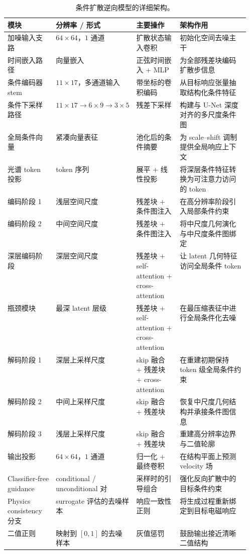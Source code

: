 \documentclass[10pt,a4paper]{article}
\begin{document}
\begin{table}[!htbp]
\centering
\caption{条件扩散逆向模型的详细架构。}
\begin{tabularx}{\linewidth}{>{\raggedright\arraybackslash}p{0.20\linewidth}>{\raggedright\arraybackslash}p{0.18\linewidth}>{\raggedright\arraybackslash}p{0.18\linewidth}X}
\toprule
模块 & 分辨率 / 形式 & 主要操作 & 架构作用 \\
\midrule
加噪输入支路 & $64\times64$，$1$ 通道 & 扩散状态输入卷积 & 初始化空间去噪主干 \\
时间嵌入路径 & 向量嵌入 & 正弦时间嵌入 + MLP & 为全部残差块编码扩散步信息 \\
条件编码器 stem & $11\times17$，多通道输入 & 带坐标的卷积编码 & 从目标响应张量抽取结构化条件特征 \\
条件下采样路径 & $11\times17 \rightarrow 6\times9 \rightarrow 3\times5$ & 残差下采样 & 构建与 U-Net 深度对齐的多尺度条件图 \\
全局条件向量 & 紧凑向量表征 & 池化后的条件摘要 & 为 scale--shift 调制提供全局响应上下文 \\
光谱 token 投影 & token 序列 & 展平 + 线性投影 & 将深层条件特征转换为可注意力访问的 token \\
编码阶段 1 & 浅层空间尺度 & 残差块 + 条件图注入 & 在高分辨率阶段引入局部条件约束 \\
编码阶段 2 & 中间空间尺度 & 残差块 + 条件图注入 & 将中尺度几何演化与中尺度条件图绑定 \\
深层编码阶段 & 深层空间尺度 & 残差块 + self-attention + cross-attention & 让 latent 几何特征访问全局条件 token \\
瓶颈模块 & 最深 latent 层级 & 残差块 + self-attention + cross-attention & 在最压缩表征中进行全局条件化去噪 \\
解码阶段 1 & 深层上采样尺度 & skip 融合 + 残差块 + cross-attention & 在重建初期保持 token 级全局条件约束 \\
解码阶段 2 & 中间上采样尺度 & skip 融合 + 残差块 & 恢复中尺度几何结构并承接条件图信息 \\
解码阶段 3 & 浅层上采样尺度 & skip 融合 + 残差块 & 重建高分辨率边界与二值轮廓 \\
输出投影 & $64\times64$，$1$ 通道 & 归一化 + 最终卷积 & 在结构平面上预测 velocity 场 \\
Classifier-free guidance & conditional / unconditional 对 & 采样时的引导组合 & 强化反向扩散中的目标条件约束 \\
Physics consistency 分支 & surrogate 评估的去噪样本 & 响应一致性正则 & 将生成过程重新绑定到目标电磁响应 \\
二值正则 & 映射到 $[0,1]$ 的去噪样本 & 灰值惩罚 & 鼓励输出接近清晰二值结构 \\
\bottomrule
\end{tabularx}
\end{table}
\end{document}
